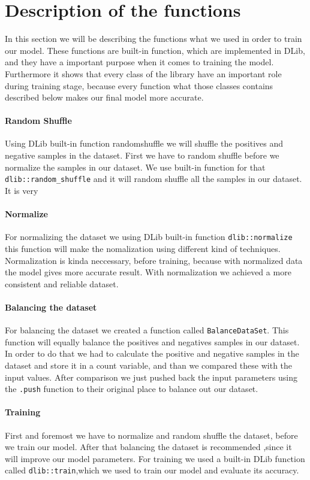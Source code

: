 \documentclass[english,12pt,oneside,a4paper]{article}
\begin{document}
		\section{Description of the functions}
		In this section we will be describing the functions what we used in order to train our model. These functions are built-in function, which are implemented in DLib, and they have a important purpose when it comes to training the model. Furthermore it shows that every class of the library have an important role during training stage, because every function what those classes contains described below makes our final model more accurate. 
		
		\paragraph{Random Shuffle}
		Using DLib built-in function randomshuffle we will shuffle the positives and negative samples in the dataset.
		First we have to random shuffle before we normalize the samples in our dataset. We use built-in function for that \verb|dlib::random_shuffle| and it will random shuffle all the samples in our dataset. It is very
		\paragraph{Normalize}
		For normalizing the dataset we using DLib built-in function \verb|dlib::normalize| this function will make the nomalization using different kind of techniques.
		Normalization is kinda neccessary, before training, because with normalized data the model gives more accurate result. With normalization we achieved a more consistent and reliable dataset.
		\paragraph{Balancing the dataset}
		For balancing the dataset we created a function called \verb|BalanceDataSet|. This function will equally balance the positives and negatives samples in our dataset. In order to do that we had to calculate the positive and negative samples in the dataset and store it in a count variable, and than we compared these with the input values. After comparison we just pushed back the input parameters using the  \verb|.push| function to their original place to balance out our dataset. 
		\paragraph{Training}
		 First and foremost we have to normalize and random shuffle the dataset, before we train our model. After that balancing the dataset is recommended ,since it will improve our model parameters. For training we used a built-in DLib function called \verb|dlib::train|,which we used to train our model and evaluate its accuracy.
\end{document}

